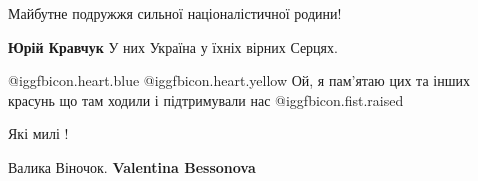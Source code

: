  
 
 
 
 
Майбутне подружжя сильної націоналістичної родини!

\textbf{Юрій Кравчук}
У них Україна у їхніх вірних Серцях.


 @igg{fbicon.heart.blue}  @igg{fbicon.heart.yellow} 
Ой, я пам'ятаю цих та інших красунь що там ходили і підтримували нас  @igg{fbicon.fist.raised} 

Які милі !

Валика Віночок. \textbf{Valentina Bessonova}
